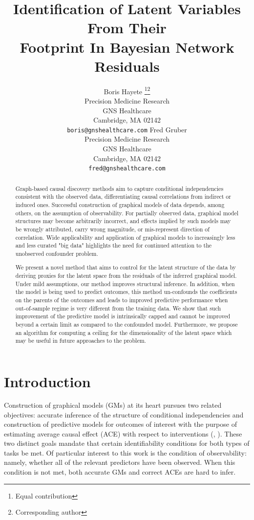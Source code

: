 \documentclass{article}
\title{Identification of Latent Variables From Their \\
           Footprint In Bayesian Network Residuals}
\author{%
  Boris Hayete \thanks{Equal contribution}\space\space\thanks{Corresponding author}\\
  Precision Medicine Research\\
  GNS Healthcare\\
  Cambridge, MA 02142 \\
  \texttt{boris@gnshealthcare.com} \And 
  Fred Gruber \footnotemark[1]\\
  Precision Medicine Research\\
  GNS Healthcare\\
  Cambridge, MA 02142 \\
  \texttt{fred@gnshealthcare.com}
}
\begin{document}
\setlength{\abovedisplayskip}{4pt}
\setlength{\belowdisplayskip}{4pt} 
\setlength{\belowcaptionskip}{-5pt}

\maketitle

\begin{abstract}
Graph-based causal discovery methods aim to capture conditional independencies consistent with the observed data, differentiating causal correlations from indirect or induced ones.  Successful construction of graphical models of data depends, among others, on the assumption of observability.  For partially observed data, graphical model structures may become arbitrarily incorrect, and effects implied by such models may be wrongly attributed, carry wrong magnitude, or mis-represent direction of correlation.  Wide applicability and application of graphical models to increasingly less and less curated "big data" highlights the need for continued attention to the unobserved confounder problem.  

We present a novel method that aims to control for the latent structure of the data by deriving proxies for the latent space from the residuals of the inferred graphical model.  Under mild assumptions, our method improves structural inference.  In addition, when the model is being used to predict outcomes, this method un-confounds the coefficients on the parents of the outcomes and leads to improved predictive performance when out-of-sample regime is very different from the training data.  We show that such improvement of the predictive model is intrinsically capped and cannot be improved beyond a certain limit as compared to the confounded model.  Furthermore, we propose an algorithm for computing a ceiling for the dimensionality of the latent space which may be useful in future approaches to the problem.
\end{abstract}

\section{Introduction}
\label{introduction}

Construction of graphical models (GMs) at its heart pursues two related objectives: accurate inference of the structure of conditional independencies and construction of predictive models for outcomes of interest with the purpose of estimating average causal effect (ACE) with respect to interventions (\cite{pearl_causality:_2000}, \cite{hernan_estimating_2006}).  These two distinct goals mandate that certain identifiability conditions for both types of tasks be met.  Of particular interest to this work is the condition of observability: namely, whether all of the relevant predictors have been observed.  When this condition is not met, both accurate GMs and correct ACEs are hard to infer.
\end{document}
